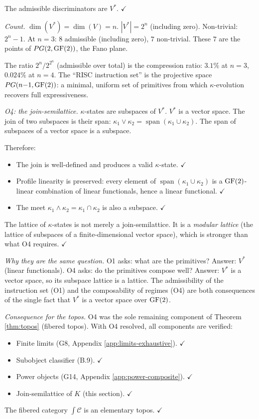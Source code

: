 The admissible discriminators are $V^*$. $\checkmark$

\emph{Count.} $\dim(V^*) = \dim(V) = n$. $|V^*| = 2^n$
(including zero). Non-trivial: $2^n - 1$. At $n = 3$:
$8$ admissible (including zero), $7$ non-trivial. These
$7$ are the points of $PG(2, \operatorname{GF}(2))$, the Fano plane.

The ratio $2^n / 2^{2^n}$ (admissible over total) is the
compression ratio: $3.1\%$ at $n = 3$, $0.024\%$ at
$n = 4$. The ``RISC instruction set'' is the projective
space $PG(n{-}1, \operatorname{GF}(2))$: a minimal, uniform set of
primitives from which $\kappa$-evolution recovers full
expressiveness.

\emph{O4: the join-semilattice.}
$\kappa$-states are subspaces of $V^*$. $V^*$ is a
vector space. The join of two subspaces is their span:
$\kappa_1 \vee \kappa_2 = \operatorname{span}(\kappa_1
\cup \kappa_2)$. The span of subspaces of a vector
space is a subspace.

Therefore:
\begin{itemize}[nosep]
  \item The join is well-defined and produces a valid
    $\kappa$-state. $\checkmark$
  \item Profile linearity is preserved: every element of
    $\operatorname{span}(\kappa_1 \cup \kappa_2)$ is a
    $\operatorname{GF}(2)$-linear combination of linear functionals,
    hence a linear functional. $\checkmark$
  \item The meet $\kappa_1 \wedge \kappa_2 = \kappa_1
    \cap \kappa_2$ is also a subspace. $\checkmark$
\end{itemize}

The lattice of $\kappa$-states is not merely a
join-semilattice. It is a \emph{modular lattice}
(the lattice of subspaces of a finite-dimensional
vector space), which is stronger than what O4 requires.
$\checkmark$

\emph{Why they are the same question.}
O1 asks: what are the primitives? Answer: $V^*$ (linear
functionals). O4 asks: do the primitives compose well?
Answer: $V^*$ is a vector space, so its subspace lattice
is a lattice. The admissibility of the instruction set
(O1) and the composability of regimes (O4) are both
consequences of the single fact that $V^*$ is a vector
space over $\operatorname{GF}(2)$.

\emph{Consequence for the topos.}
O4 was the sole remaining component of Theorem
\ref{thm:topos} (fibered topos). With O4 resolved,
all components are verified:
\begin{itemize}[nosep]
  \item Finite limits (G8, Appendix \ref{app:limits-exhaustive}). $\checkmark$
  \item Subobject classifier (B.9). $\checkmark$
  \item Power objects (G14, Appendix
    \ref{app:power-composite}). $\checkmark$
  \item Join-semilattice of $K$ (this section). $\checkmark$
\end{itemize}
The fibered category $\int \mathcal{C}$ is an elementary
topos. $\checkmark$


